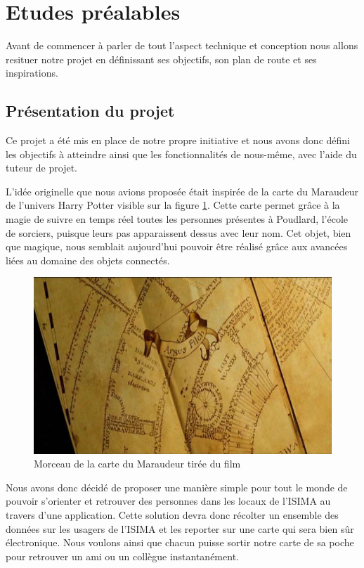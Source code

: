 \section{Etudes préalables}

Avant de commencer à parler de tout l’aspect technique et conception nous allons resituer notre projet en définissant ses objectifs, son plan de route et ses inspirations.

\subsection{Présentation du projet}

Ce projet a été mis en place de notre propre initiative et nous avons donc défini les objectifs à atteindre ainsi que les fonctionnalités de nous-même, avec l'aide du tuteur de projet.

L’idée originelle que nous avions proposée était inspirée de la carte du Maraudeur de l’univers Harry Potter visible sur la figure \ref{marauder}. Cette carte permet grâce à la magie de suivre en temps réel toutes les personnes présentes à Poudlard, l’école de sorciers, puisque leurs pas apparaissent dessus avec leur nom. Cet objet, bien que magique, nous semblait aujourd’hui pouvoir être réalisé grâce aux avancées liées au domaine des objets connectés. 

\begin{figure}[H]
    \centering
    \includegraphics[width=\textwidth]{./img/marauder.jpg}
    \caption{Morceau de la carte du Maraudeur tirée du film}
    \label{marauder}
\end{figure}

Nous avons donc décidé de proposer une manière simple pour tout le monde de pouvoir s'orienter et retrouver des personnes dans les locaux de l'ISIMA au travers d’une application. Cette solution devra donc récolter un ensemble des données sur les usagers de l’ISIMA et les reporter sur une carte qui sera bien sûr électronique. Nous voulons ainsi que chacun puisse sortir notre carte de sa poche pour retrouver un ami ou un collègue instantanément.

